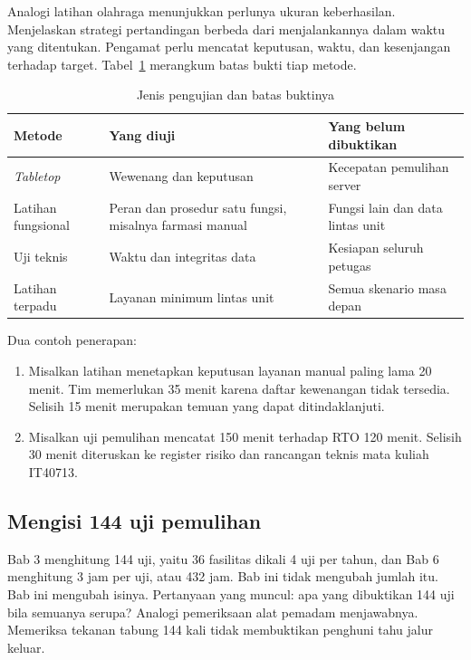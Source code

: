 Analogi latihan olahraga menunjukkan perlunya ukuran keberhasilan. Menjelaskan strategi pertandingan
berbeda dari menjalankannya dalam waktu yang ditentukan. Pengamat perlu mencatat keputusan, waktu,
dan kesenjangan terhadap target. Tabel~\ref{tab:ch10-latihan} merangkum batas bukti tiap metode.

\begin{table}[!htb]
  \centering\small
  \caption{Jenis pengujian dan batas buktinya}\label{tab:ch10-latihan}
  \begin{tabularx}{\textwidth}{|>{\raggedright\arraybackslash}p{}|>{\raggedright\arraybackslash}X|>{\raggedright\arraybackslash}X|}
    \hline
    \textbf{Metode} & \textbf{Yang diuji} & \textbf{Yang belum dibuktikan} \\ \hline
    \textit{Tabletop} & Wewenang dan keputusan & Kecepatan pemulihan server \\ \hline
    Latihan fungsional & Peran dan prosedur satu fungsi, misalnya farmasi manual & Fungsi lain dan
    data lintas unit \\ \hline
    Uji teknis & Waktu dan integritas data & Kesiapan seluruh petugas \\ \hline
    Latihan terpadu & Layanan minimum lintas unit & Semua skenario masa depan \\ \hline
  \end{tabularx}
\end{table}

Dua contoh penerapan:
\begin{enumerate}
  \item Misalkan latihan menetapkan keputusan layanan manual paling lama 20 menit. Tim memerlukan
  35 menit karena daftar kewenangan tidak tersedia. Selisih 15 menit merupakan temuan yang dapat
  ditindaklanjuti.
  \item Misalkan uji pemulihan mencatat 150 menit terhadap RTO 120 menit. Selisih 30 menit
  diteruskan ke register risiko dan rancangan teknis mata kuliah IT40713.
\end{enumerate}

\subsection*{Mengisi 144 uji pemulihan}

Bab 3 menghitung 144 uji, yaitu 36 fasilitas dikali 4 uji per tahun, dan Bab 6 menghitung 3 jam per
uji, atau 432 jam. Bab ini tidak mengubah jumlah itu. Bab ini mengubah isinya. Pertanyaan yang
muncul: apa yang dibuktikan 144 uji bila semuanya serupa? Analogi pemeriksaan alat pemadam
menjawabnya. Memeriksa tekanan tabung 144 kali tidak membuktikan penghuni tahu jalur keluar.


